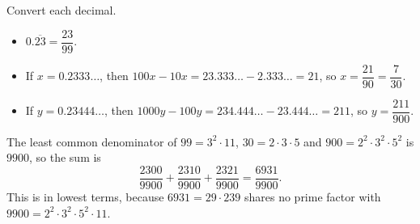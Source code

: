 Convert each decimal.
\begin{itemize}
\item $0.\overline{23}=\dfrac{23}{99}$.
\item If $x=0.2333\ldots$, then $100x-10x=23.333\ldots-2.333\ldots=21$, so $x=\dfrac{21}{90}=\dfrac{7}{30}$.
\item If $y=0.23444\ldots$, then $1000y-100y=234.444\ldots-23.444\ldots=211$, so $y=\dfrac{211}{900}$.
\end{itemize}
The least common denominator of $99=3^2\cdot11$, $30=2\cdot3\cdot5$ and $900=2^2\cdot3^2\cdot5^2$ is $9900$, so the sum is
\[\dfrac{2300}{9900}+\dfrac{2310}{9900}+\dfrac{2321}{9900}=\boxed{\dfrac{6931}{9900}}.\]
This is in lowest terms, because $6931=29\cdot239$ shares no prime factor with $9900=2^2\cdot3^2\cdot5^2\cdot11$.
